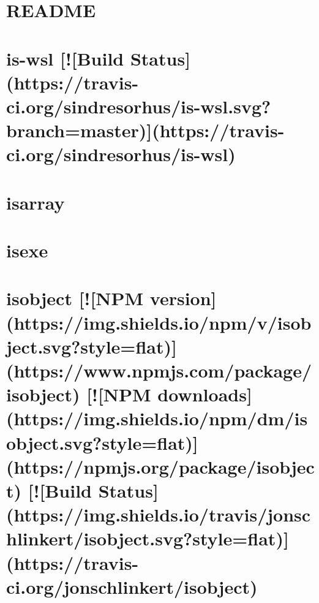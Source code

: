 \documentclass[twoside]{book}
\newcommand{\+}{\discretionary{\mbox{\scriptsize$\hookleftarrow$}}{}{}}
\begin{document}
\chapter{R\+E\+A\+D\+ME}
\label{md__c_1_workspace_demo_src_main_script_node_modules_is-utf8__r_e_a_d_m_e}

\chapter{is-\/wsl \mbox{[}!\mbox{[}Build Status\mbox{]}(https\+://travis-\/ci.org/sindresorhus/is-\/wsl.svg?branch=master)\mbox{]}(https\+://travis-\/ci.org/sindresorhus/is-\/wsl)}
\label{md__c_1_workspace_demo_src_main_script_node_modules_is-wsl_readme}

\chapter{isarray}
\label{md__c_1_workspace_demo_src_main_script_node_modules_isarray__r_e_a_d_m_e}

\chapter{isexe}
\label{md__c_1_workspace_demo_src_main_script_node_modules_isexe__r_e_a_d_m_e}

\chapter{isobject \mbox{[}!\mbox{[}N\+PM version\mbox{]}(https\+://img.shields.\+io/npm/v/isobject.svg?style=flat)\mbox{]}(https\+://www.npmjs.\+com/package/isobject) \mbox{[}!\mbox{[}N\+PM downloads\mbox{]}(https\+://img.shields.\+io/npm/dm/isobject.svg?style=flat)\mbox{]}(https\+://npmjs.org/package/isobject) \mbox{[}!\mbox{[}Build Status\mbox{]}(https\+://img.shields.\+io/travis/jonschlinkert/isobject.svg?style=flat)\mbox{]}(https\+://travis-\/ci.org/jonschlinkert/isobject)}
\label{md__c_1_workspace_demo_src_main_script_node_modules_isobject__r_e_a_d_m_e}

\end{document}
